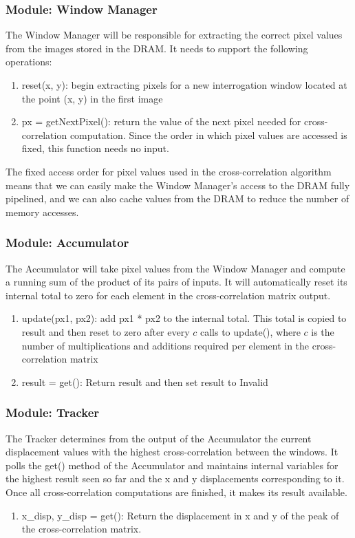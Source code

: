 \documentclass{article}
\begin{document}
	\subsubsection{Module: Window Manager}
	The Window Manager will be responsible for extracting the correct pixel values from the images stored in the DRAM. It needs to support the following operations: 
	\begin{enumerate}
		\item reset(x, y): begin extracting pixels for a new interrogation window located at the point (x, y) in the first image
		\item px = getNextPixel(): return the value of the next pixel needed for cross-correlation computation. Since the order in which pixel values are accessed is fixed, this function needs no input.
	\end{enumerate}
	The fixed access order for pixel values used in the cross-correlation algorithm means that we can easily make the Window Manager's access to the DRAM fully pipelined, and we can also cache values from the DRAM to reduce the number of memory accesses.

	\subsubsection{Module: Accumulator}
	The Accumulator will take pixel values from the Window Manager and compute a running sum of the product of its pairs of inputs. It will automatically reset its internal total to zero for each element in the cross-correlation matrix output.
	\begin{enumerate}
		\item update(px1, px2): add px1 * px2 to the internal total. This total is copied to result and then reset to zero after every $c$ calls to update(), where $c$ is the number of multiplications and additions required per element in the cross-correlation matrix
		\item result = get(): Return result and then set result to Invalid
	\end{enumerate}

	\subsubsection{Module: Tracker}
	The Tracker determines from the output of the Accumulator the current displacement values with the highest cross-correlation between the windows. It polls the get() method of the Accumulator and maintains internal variables for the highest result seen so far and the x and y displacements corresponding to it. Once all cross-correlation computations are finished, it makes its result available. 
	\begin{enumerate}
		\item x\_disp, y\_disp = get(): Return the displacement in x and y of the peak of the cross-correlation matrix.
	\end{enumerate}
\end{document}
